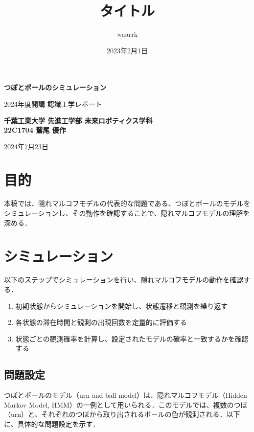 \documentclass[dvipdfmx,titlepage,a4j]{jsarticle}
\title{タイトル}
\author{waarrk}
\date{2023年2月1日}
\begin{document}
\begin{titlepage}
    \centering
    \vspace*{2cm}

    \vspace{1cm}

    {\LARGE \textbf{つぼとボールのシミュレーション}}

    \vspace{0.5cm}

    {\LARGE 2024年度開講 認識工学レポート}

    \vspace{1.5cm}

    {\textbf{千葉工業大学 先進工学部 未来ロボティクス学科}\\}
    {\textbf{22C1704 鷲尾 優作}}

    \vfill

    {\large 2024年7月23日}

    \vspace{1cm}
\end{titlepage}

\section{目的}
本稿では、隠れマルコフモデルの代表的な問題である、つぼとボールのモデルをシミュレーションし、その動作を確認することで、隠れマルコフモデルの理解を深める．

\section{シミュレーション}

以下のステップでシミュレーションを行い、隠れマルコフモデルの動作を確認する．

\begin{enumerate}
    \item 初期状態からシミュレーションを開始し、状態遷移と観測を繰り返す
    \item 各状態の滞在時間と観測の出現回数を定量的に評価する
    \item 状態ごとの観測確率を計算し、設定されたモデルの確率と一致するかを確認する
\end{enumerate}

\subsection{問題設定}

つぼとボールのモデル（urn and ball model）は、隠れマルコフモデル（Hidden Markov Model, HMM）の一例として用いられる．このモデルでは、複数のつぼ（urn）と、それぞれのつぼから取り出されるボールの色が観測される．以下に、具体的な問題設定を示す．
\end{document}
